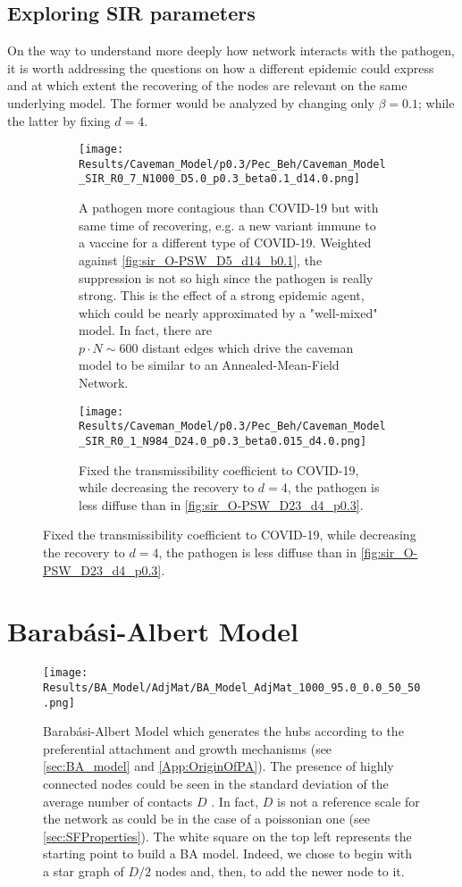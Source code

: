 \documentclass[a4paper,10pt,twoside]{book} %
\theoremstyle{definition}
\begin{document}
\clearpage
\subsection*{Exploring SIR parameters}
On the way to understand more deeply how network interacts with the pathogen, it is worth addressing the questions on how a different epidemic could express and at which extent the recovering of the nodes are relevant on the same underlying model. The former would be analyzed by changing only $\beta = 0.1$; while the latter by fixing $d = 4$.
\begin{figure}[H]
	\centering
	\begin{subfigure}{0.9\linewidth}
		\texttt{[image: Results/Caveman\_Model/p0.3/Pec\_Beh/Caveman\_Model\_SIR\_R0\_7\_N1000\_D5.0\_p0.3\_beta0.1\_d14.0.png]}
		\caption{A pathogen more contagious than COVID-19 but with same time of recovering, e.g. a new variant immune to a vaccine for a different type of COVID-19. Weighted against \autoref{fig:sir_O-PSW_D5_d14_b0.1}, the suppression is not so high since the pathogen is really strong. This is the effect of a strong epidemic agent, which could be nearly approximated by a "well-mixed" model. In fact, there are \\ $p \cdot N \sim 600$ distant edges which drive the caveman model to be similar to an Annealed-Mean-Field Network.}
		\label{fig:sir_CM_D4_p0.3_OR1_b0.1}
	\end{subfigure}
	\par\bigskip
	\centering
	\begin{subfigure}{0.9\linewidth}
		\texttt{[image: Results/Caveman\_Model/p0.3/Pec\_Beh/Caveman\_Model\_SIR\_R0\_1\_N984\_D24.0\_p0.3\_beta0.015\_d4.0.png]}
		\caption{Fixed the transmissibility coefficient to COVID-19, while decreasing the recovery to $d = 4$, the pathogen is less diffuse than in \autoref{fig:sir_O-PSW_D23_d4_p0.3}.}
		\label{fig:sir_CM_D23_d4_p0.3}
	\end{subfigure}
\end{figure}

\clearpage
\section{Barabási-Albert Model}
\begin{figure}[t]
	\centering
	\texttt{[image: Results/BA\_Model/AdjMat/BA\_Model\_AdjMat\_1000\_95.0\_0.0\_50\_50.png]}
	\caption{Barabási-Albert Model which generates the hubs according to the preferential attachment and growth mechanisms (see \autoref{sec:BA_model} and \autoref{App:OriginOfPA}). The presence of highly connected nodes could be seen in the standard deviation of the average number of contacts $ D$ . In fact, $ D$ is not a reference scale for the network as could be in the case of a poissonian one (see \autoref{sec:SFProperties}). The white square on the top left represents the starting point to build a BA model. Indeed, we chose to begin with a star graph of $D/2$ nodes and, then, to add the newer node to it.}
	\label{fig:BA_model_Network}
\end{figure}
\end{document}
